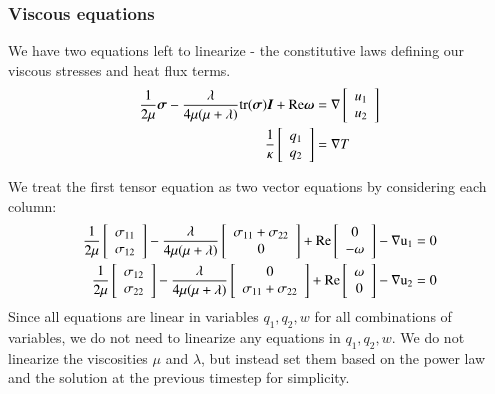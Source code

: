 
\subsubsection{Viscous equations}
We have two equations left to linearize - the constitutive laws defining our viscous stresses and heat flux terms. 
\begin{align*}
\frac{1}{2\mu}{\boldsymbol \sigma}- \frac{\lambda}{4\mu(\mu+\lambda)}{\rm tr}({\boldsymbol \sigma}){\boldsymbol I} + \Reyn {\boldsymbol \omega} &= 
\grad
\left[\begin{array}{c}
u_1\\
u_2
\end{array}
\right]\\
\frac{1}{\kappa}
\left[\begin{array}{c}
q_1\\
q_2
\end{array}\right] &=
\grad T
\end{align*}

We treat the first tensor equation as two vector equations by considering each column:
\begin{align*}
\frac{1}{2\mu} \vecttwo{\sigma_{11}}{\sigma_{12}} - \frac{\lambda}{4\mu(\mu+\lambda)}\vecttwo{\sigma_{11}+\sigma_{22}}{0} + \Reyn\vecttwo{0}{-\omega} - \grad u_1&= 0 \\
\frac{1}{2\mu} \vecttwo{\sigma_{12}}{\sigma_{22}} - \frac{\lambda}{4\mu(\mu+\lambda)}\vecttwo{0}{\sigma_{11}+\sigma_{22}} + \Reyn\vecttwo{\omega}{0} - \grad u_2 &= 0
\end{align*}
Since all equations are linear in variables $q_1, q_2, w$ for all combinations of variables, we do not need to linearize any equations in $q_1, q_2, w$.  We do not linearize the viscosities $\mu$ and $\lambda$, but instead set them based on the power law and the solution at the previous timestep for simplicity. 

